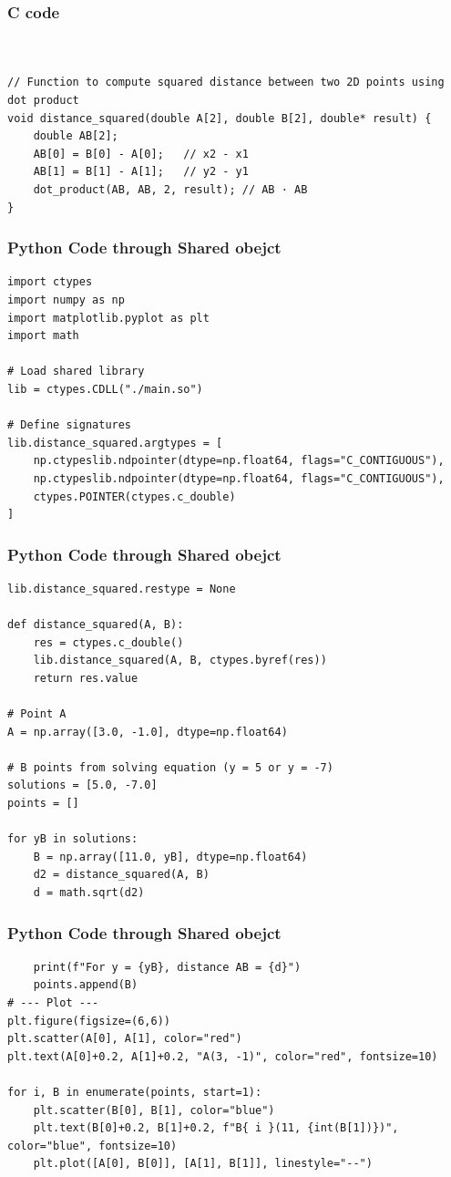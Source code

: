 \documentclass{beamer}
\begin{document}
\begin{frame}[fragile]
\frametitle{C code}
\begin{lstlisting}


// Function to compute squared distance between two 2D points using dot product
void distance_squared(double A[2], double B[2], double* result) {
    double AB[2];
    AB[0] = B[0] - A[0];   // x2 - x1
    AB[1] = B[1] - A[1];   // y2 - y1
    dot_product(AB, AB, 2, result); // AB · AB
}
\end{lstlisting}
\end{frame}
\begin{frame}[fragile]
\frametitle{Python Code through Shared obejct}
\begin{lstlisting}
import ctypes
import numpy as np
import matplotlib.pyplot as plt
import math

# Load shared library
lib = ctypes.CDLL("./main.so")

# Define signatures
lib.distance_squared.argtypes = [
    np.ctypeslib.ndpointer(dtype=np.float64, flags="C_CONTIGUOUS"),
    np.ctypeslib.ndpointer(dtype=np.float64, flags="C_CONTIGUOUS"),
    ctypes.POINTER(ctypes.c_double)
]
\end{lstlisting}
\end{frame}
\begin{frame}[fragile]
\frametitle{Python Code through Shared obejct}
\begin{lstlisting}
lib.distance_squared.restype = None

def distance_squared(A, B):
    res = ctypes.c_double()
    lib.distance_squared(A, B, ctypes.byref(res))
    return res.value

# Point A
A = np.array([3.0, -1.0], dtype=np.float64)

# B points from solving equation (y = 5 or y = -7)
solutions = [5.0, -7.0]
points = []

for yB in solutions:
    B = np.array([11.0, yB], dtype=np.float64)
    d2 = distance_squared(A, B)
    d = math.sqrt(d2)
\end{lstlisting}
\end{frame}
\begin{frame}[fragile]
\frametitle{Python Code through Shared obejct}
\begin{lstlisting}
    print(f"For y = {yB}, distance AB = {d}")
    points.append(B)
# --- Plot ---
plt.figure(figsize=(6,6))
plt.scatter(A[0], A[1], color="red")
plt.text(A[0]+0.2, A[1]+0.2, "A(3, -1)", color="red", fontsize=10)

for i, B in enumerate(points, start=1):
    plt.scatter(B[0], B[1], color="blue")
    plt.text(B[0]+0.2, B[1]+0.2, f"B{ i }(11, {int(B[1])})", color="blue", fontsize=10)
    plt.plot([A[0], B[0]], [A[1], B[1]], linestyle="--")
\end{lstlisting}
\end{frame}
\end{document}
